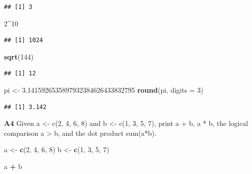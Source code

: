 \documentclass[
]{article}
\newenvironment{Shaded}{\begin{snugshade}}{\end{snugshade}}
\newcommand{\AttributeTok}[1]{\textcolor[rgb]{0.13,0.29,0.53}{#1}}
\newcommand{\DecValTok}[1]{\textcolor[rgb]{0.00,0.00,0.81}{#1}}
\newcommand{\FloatTok}[1]{\textcolor[rgb]{0.00,0.00,0.81}{#1}}
\newcommand{\FunctionTok}[1]{\textcolor[rgb]{0.13,0.29,0.53}{\textbf{#1}}}
\newcommand{\NormalTok}[1]{#1}
\newcommand{\OtherTok}[1]{\textcolor[rgb]{0.56,0.35,0.01}{#1}}
\newcommand{\SpecialCharTok}[1]{\textcolor[rgb]{0.81,0.36,0.00}{\textbf{#1}}}
\begin{document}
\begin{verbatim}
## [1] 3
\end{verbatim}

\begin{Shaded}
\begin{Highlighting}[]
\DecValTok{2}\SpecialCharTok{\^{}}\DecValTok{10}
\end{Highlighting}
\end{Shaded}

\begin{verbatim}
## [1] 1024
\end{verbatim}

\begin{Shaded}
\begin{Highlighting}[]
\FunctionTok{sqrt}\NormalTok{(}\DecValTok{144}\NormalTok{)}
\end{Highlighting}
\end{Shaded}

\begin{verbatim}
## [1] 12
\end{verbatim}

\begin{Shaded}
\begin{Highlighting}[]
\NormalTok{pi }\OtherTok{\textless{}{-}} \FloatTok{3.1415926535897932384626433832795}
\FunctionTok{round}\NormalTok{(pi, }\AttributeTok{digits =} \DecValTok{3}\NormalTok{)}
\end{Highlighting}
\end{Shaded}

\begin{verbatim}
## [1] 3.142
\end{verbatim}

\textbf{A4} Given a \textless- c(2, 4, 6, 8) and b \textless- c(1, 3, 5,
7), print a + b, a * b, the logical comparison a \textgreater{} b, and
the dot product sum(a*b).

\begin{Shaded}
\begin{Highlighting}[]
\NormalTok{a }\OtherTok{\textless{}{-}} \FunctionTok{c}\NormalTok{(}\DecValTok{2}\NormalTok{, }\DecValTok{4}\NormalTok{, }\DecValTok{6}\NormalTok{, }\DecValTok{8}\NormalTok{)}
\NormalTok{b }\OtherTok{\textless{}{-}} \FunctionTok{c}\NormalTok{(}\DecValTok{1}\NormalTok{, }\DecValTok{3}\NormalTok{, }\DecValTok{5}\NormalTok{, }\DecValTok{7}\NormalTok{)}

\NormalTok{a }\SpecialCharTok{+}\NormalTok{ b}
\end{Highlighting}
\end{Shaded}
\end{document}
